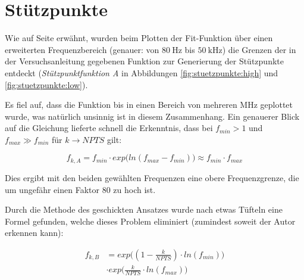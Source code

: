 {%
    \clearpage
    \pdfpagewidth
	\textwidth
    \addtolength{\textwidth}{70mm}
    \begin{minipage}[t]{.265\textwidth}
        \section{St\"utzpunkte}
        \label{app:points}
        Wie auf Seite \pageref{tab:meas:steel}  erw\"ahnt, wurden beim Plotten
        der  Fit-Funktion \"uber  einen erweiterten  Frequenzbereich (genauer:
        von  $\SI{80}{\hertz}$  bis  $\SI{50}{\kilo\hertz}$) die  Grenzen  der
        in  der  Versuchsanleitung  gegebenen  Funktion  zur  Generierung  der
        St\"utzpunkte entdeckt  (\emph{St\"utzpunktfunktion A}  in Abbildungen
        \ref{fig:stuetzpunkte:high} und \ref{fig:stuetzpunkte:low}).

        Es  fiel auf,  dass die  Funktion bis  in einen  Bereich von  mehreren
        $\si{\mega\hertz}$ geplottet  wurde, was  nat\"urlich unsinnig  ist in
        diesem Zusammenhang. Ein  genauerer Blick  auf die  Gleichung lieferte
        schnell  die  Erkenntnis, dass  bei  $f_{min}  >  1$ und  $f_{max} \gg
        f_{min}$ f\"ur $k \rightarrow NPTS$ gilt:

        \begin{equation*}
            f_{k,A} = f_{min} \cdot exp\Biggl( ln(f_{max} - f_{min}) \Biggr) \approx f_{min} \cdot f_{max}
        \end{equation*}

        Dies  ergibt   mit  den  beiden  gew\"ahlten   Frequenzen  eine  obere
        Frequenzgrenze, die um ungef\"ahr einen Faktor $\num{80}$ zu hoch ist.

        Durch die Methode des geschickten  Ansatzes wurde nach etwas T\"ufteln
        eine  Formel gefunden,  welche  dieses  Problem eliminiert  (zumindest
        soweit der Autor erkennen kann):

        \begin{equation*}
            \begin{split}
                f_{k,B} & = exp\Biggl( (1-\frac{k}{NPTS}) \cdot ln(f_{min}) \Biggr) \\
                & \cdot exp\Biggl( \frac{k}{NPTS} \cdot ln(f_{max}) \Biggr)
            \end{split}
        \end{equation*}


\end{minipage}}
